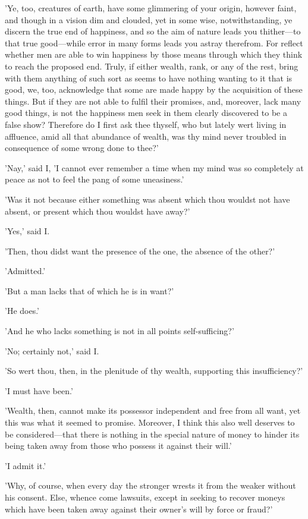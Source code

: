 'Ye, too, creatures of earth, have some glimmering of your origin,
however faint, and though in a vision dim and clouded, yet in some wise,
notwithstanding, ye discern the true end of happiness, and so the aim of
nature leads you thither—to that true good—while error in many forms
leads you astray therefrom. For reflect whether men are able to win
happiness by those means through which they think to reach the proposed
end. Truly, if either wealth, rank, or any of the rest, bring with them
anything of such sort as seems to have nothing wanting to it that is
good, we, too, acknowledge that some are made happy by the acquisition
of these things. But if they are not able to fulfil their promises, and,
moreover, lack many good things, is not the happiness men seek in them
clearly discovered to be a false show? Therefore do I first ask thee
thyself, who but lately wert living in affluence, amid all that
abundance of wealth, was thy mind never troubled in consequence of some
wrong done to thee?'

'Nay,' said I, 'I cannot ever remember a time when my mind was so
completely at peace as not to feel the pang of some uneasiness.'

'Was it not because either something was absent which thou wouldst not
have absent, or present which thou wouldst have away?'

'Yes,' said I.

'Then, thou didst want the presence of the one, the absence of the
other?'

'Admitted.'

'But a man lacks that of which he is in want?'

'He does.'

'And he who lacks something is not in all points self-sufficing?'

'No; certainly not,' said I.

'So wert thou, then, in the plenitude of thy wealth, supporting this
insufficiency?'

'I must have been.'

'Wealth, then, cannot make its possessor independent and free from all
want, yet this was what it seemed to promise. Moreover, I think this
also well deserves to be considered—that there is nothing in the
special nature of money to hinder its being taken away from those who
possess it against their will.'

'I admit it.'

'Why, of course, when every day the stronger wrests it from the weaker
without his consent. Else, whence come lawsuits, except in seeking to
recover moneys which have been taken away against their owner's will by
force or fraud?'

